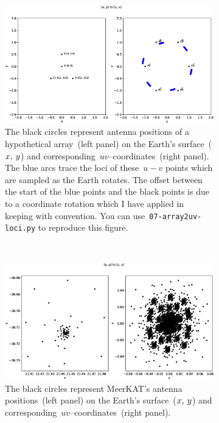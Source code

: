 \documentclass[11pt, a4paper]{article}
\newcommand{\msp}{\mkern \medmuskip}
\begin{document}
\begin{figure}
\begin{subfigure}[b]{\textwidth }
  \centering
  \includegraphics[width=\linewidth ]{06-array2uv-triangle.eps}
  \caption{The black circles represent antenna positions of a hypothetical array~(left panel) on the Earth's surface~($x,\msp y$) and corresponding~$uv$--coordinates~(right panel). The blue arcs trace the loci of these~$u-v$ points which are sampled as the Earth rotates. The offset between the start of the blue points and the black points is due to a coordinate rotation which I have applied in keeping with convention. You can use~\texttt{07-array2uv-loci.py} to reproduce this figure.\\}
  \label{fig:06-array2uv-triangle}
\end{subfigure}\\
\begin{subfigure}[b]{\textwidth }
  \centering
  \includegraphics[width=\linewidth ]{06-array2uv-meerkat.eps}
  \caption{The black circles represent MeerKAT's antenna positions~(left panel) on the Earth's surface~($x,\msp y$) and corresponding~$uv$--coordinates~(right panel).}
  \label{fig:07-array2uv-meerkat}
\end{subfigure}
\caption{}
\label{fig:xy-uv}
\end{figure}
\end{document}
